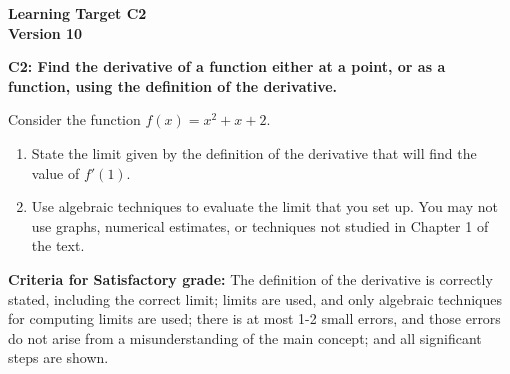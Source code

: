 \documentclass[10pt]{article}
\begin{document}
	\vspace*{0in}

		\begin{center}
			\textbf{Learning Target C2 \\
			Version 10} %
		\end{center}


\begin{framed}
	\textbf{C2: Find the derivative of a function either at a point, or as a function, using the definition of the derivative.
}
\end{framed}

Consider the function $f(x) = x^2 + x + 2$. 

\begin{enumerate}
    \item State the limit given by the definition of the derivative that will find the value of $f'(1).$
    
    \vspace{1in} 
    
    
    \item Use algebraic techniques to evaluate the limit that you set up. You may not use graphs, numerical estimates, or techniques not studied in Chapter 1 of the text. 
\end{enumerate}



\vfill


\begin{small}
    \begin{framed}
        	\textbf{Criteria for Satisfactory grade:} The definition of the derivative is correctly stated, including the correct limit; limits are used, and only algebraic techniques for computing limits are used; there is at most 1-2 small errors, and those errors do not arise from a misunderstanding of the main concept; and all significant steps are shown. 
    \end{framed}

\end{small}
\end{document}
